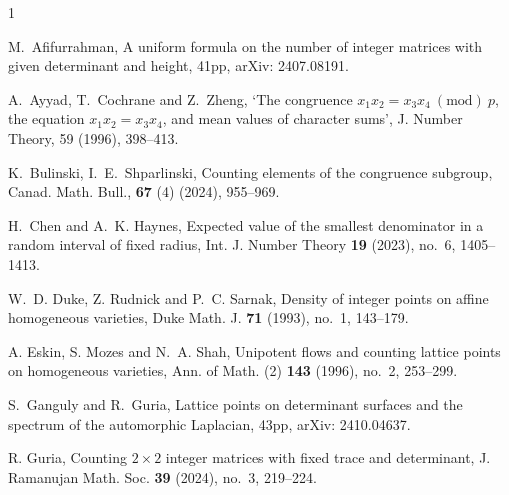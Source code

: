 \documentclass[reqno]{amsart}
\begin{document}
\begin{thebibliography}{1}
			

%

M.~Afifurrahman, A uniform formula on the number of integer matrices with given determinant and height, 41pp, arXiv: 2407.08191.

\vspace*{.1in}

A.~Ayyad, T.~Cochrane and Z.~Zheng, ‘The congruence $x_1x_2=x_3x_4~(\mathrm{mod})~p$,
the equation $x_1x_2=x_3x_4$, and mean values of character sums’, J. Number Theory, 59 (1996), 398--413.

\vspace*{.1in}

K.~Bulinski, I.~E.~Shparlinski, Counting elements of the congruence subgroup,
Canad. Math. Bull., {\bf 67} (4) (2024), 955--969.

\vspace*{.1in}

H.~Chen and A.~K. Haynes, Expected value of the smallest denominator in a random interval of fixed radius, Int. J. Number Theory {\bf 19} (2023), no.~6, 1405--1413.

\vspace*{.1in}

W.~D. Duke, Z. Rudnick and P.~C. Sarnak, Density of integer points on affine homogeneous varieties, Duke Math. J. {\bf 71} (1993), no.~1, 143--179.

\vspace*{.1in}

A. Eskin, S. Mozes and N.~A. Shah, Unipotent flows and counting lattice points on homogeneous varieties, Ann. of Math. (2) {\bf 143} (1996), no.~2, 253--299.

\vspace*{.1in}

S.~Ganguly and R.~Guria, Lattice points on determinant surfaces and the spectrum of the automorphic Laplacian,  43pp, arXiv: 2410.04637.

\vspace*{.1in}

R. Guria, Counting $2\times 2$ integer matrices with fixed trace and determinant, J. Ramanujan Math. Soc. {\bf 39} (2024), no.~3, 219--224.


\end{thebibliography}
\end{document}
